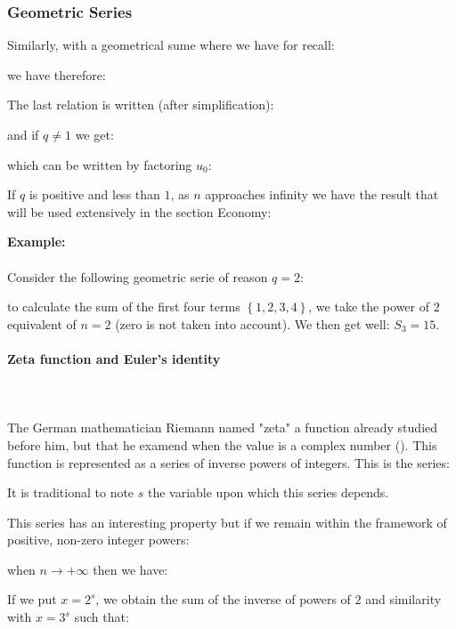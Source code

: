 	\subsubsection{Geometric Series}
	Similarly, with a geometrical sume where we have for recall:
	
	we have therefore:
	
	The last relation is written (after simplification):
	
	and if $q\neq 1$ we get:
	
	which can be written by factoring $u_0$:
	
	If $q$ is positive and less than $1$, as $n$ approaches infinity we have the result that will be used extensively in the section Economy:
	
	
	\begin{tcolorbox}[colframe=black,colback=white,sharp corners]
	\textbf{{\Large {}}Example:}\\\\
	Consider the following geometric serie of reason $q = 2$:
	
	to calculate the sum of the first four terms $\left\lbrace 1,2,3,4 \right\rbrace$, we take the power of $2$ equivalent of $n=2$ (zero is not taken into account). We then get well: $S_3=15$.
	\end{tcolorbox}
	
	\paragraph{Zeta function and Euler's identity}\mbox{}\\\\
	The German mathematician Riemann named "zeta" a function already studied before him, but that he examend when the value is a complex number (). This function is represented as a series of inverse powers of integers. This is the series:

	
	\begin{tcolorbox}[title=Remarks,colframe=black,arc=10pt]
	It is traditional to note $s$ the variable upon which this series depends.
	\end{tcolorbox}
	This series has an interesting property but if we remain within the framework of positive, non-zero integer powers:
	
	when $n\longrightarrow +\infty$ then we have:
	
	If we put $x=2^s$, we obtain the sum of the inverse of powers of $2$ and similarity with $x=3^s$ such that:
	
